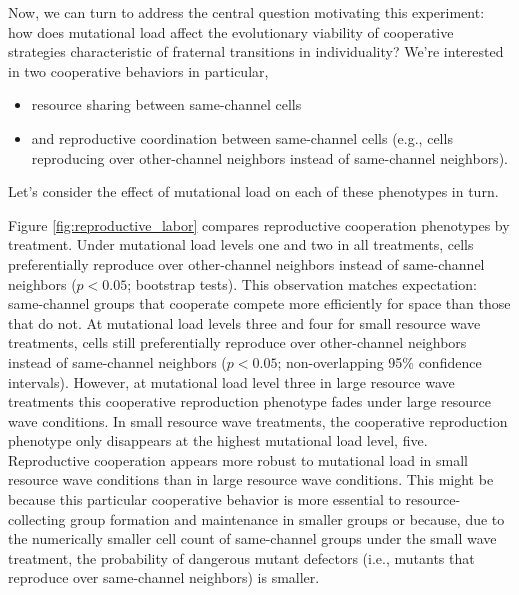 Now, we can turn to address the central question motivating this experiment: how does mutational load affect the evolutionary viability of cooperative strategies characteristic of fraternal transitions in individuality?
We're interested in two cooperative behaviors in particular,
\begin{itemize}
\item resource sharing between same-channel cells
\item and reproductive coordination between same-channel cells (e.g., cells reproducing over other-channel neighbors instead of same-channel neighbors).
\end{itemize}
Let's consider the effect of mutational load on each of these phenotypes in turn.



Figure \ref{fig:reproductive_labor} compares reproductive cooperation phenotypes by treatment.
Under mutational load levels one and two in all treatments, cells preferentially reproduce over other-channel neighbors instead of same-channel neighbors ($p < 0.05$; bootstrap tests).
This observation matches expectation: same-channel groups that cooperate compete more efficiently for space than those that do not.
At mutational load levels three and four for small resource wave treatments, cells still preferentially reproduce over other-channel neighbors instead of same-channel neighbors ($p < 0.05$; non-overlapping 95\% confidence intervals).
However, at mutational load level three in large resource wave treatments this cooperative reproduction phenotype fades under large resource wave conditions.
In small resource wave treatments, the cooperative reproduction phenotype only disappears at the highest mutational load level, five.
Reproductive cooperation appears more robust to mutational load in small resource wave conditions than in large resource wave conditions.
This might be because this particular cooperative behavior is more essential to resource-collecting group formation and maintenance in smaller groups or because, due to the numerically smaller cell count of same-channel groups under the small wave treatment, the probability of dangerous mutant defectors (i.e., mutants that reproduce over same-channel neighbors) is smaller.

